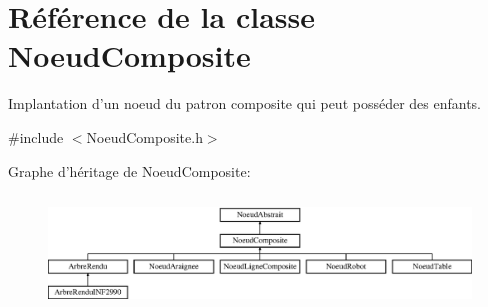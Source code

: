 \hypertarget{class_noeud_composite}{\section{Référence de la classe Noeud\-Composite}
\label{class_noeud_composite}
}


Implantation d'un noeud du patron composite qui peut posséder des enfants.  




{\ttfamily \#include $<$Noeud\-Composite.\-h$>$}

Graphe d'héritage de Noeud\-Composite\-:\begin{figure}[H]
\begin{center}
\leavevmode
\includegraphics[height=3.068493cm]{class_noeud_composite}
\end{center}
\end{figure}
